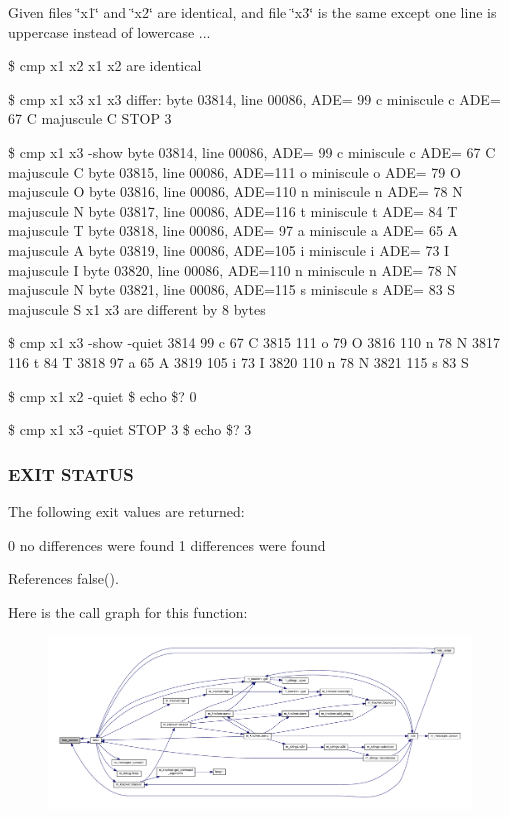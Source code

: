 Given files \char`\"{}x1\char`\"{} and \char`\"{}x2\char`\"{} are identical, and file \char`\"{}x3\char`\"{} is the same except one line is uppercase instead of lowercase ...

\$ cmp x1 x2 x1 x2 are identical

\$ cmp x1 x3 x1 x3 differ\+: byte 03814, line 00086, A\+DE= 99 c miniscule c A\+DE= 67 C majuscule C S\+T\+OP 3

\$ cmp x1 x3 -\/show byte 03814, line 00086, A\+DE= 99 c miniscule c A\+DE= 67 C majuscule C byte 03815, line 00086, A\+DE=111 o miniscule o A\+DE= 79 O majuscule O byte 03816, line 00086, A\+DE=110 n miniscule n A\+DE= 78 N majuscule N byte 03817, line 00086, A\+DE=116 t miniscule t A\+DE= 84 T majuscule T byte 03818, line 00086, A\+DE= 97 a miniscule a A\+DE= 65 A majuscule A byte 03819, line 00086, A\+DE=105 i miniscule i A\+DE= 73 I majuscule I byte 03820, line 00086, A\+DE=110 n miniscule n A\+DE= 78 N majuscule N byte 03821, line 00086, A\+DE=115 s miniscule s A\+DE= 83 S majuscule S x1 x3 are different by 8 bytes

\$ cmp x1 x3 -\/show -\/quiet 3814 99 c 67 C 3815 111 o 79 O 3816 110 n 78 N 3817 116 t 84 T 3818 97 a 65 A 3819 105 i 73 I 3820 110 n 78 N 3821 115 s 83 S

\$ cmp x1 x2 -\/quiet \$ echo \$? 0

\$ cmp x1 x3 -\/quiet S\+T\+OP 3 \$ echo \$? 3

\subsubsection*{E\+X\+IT S\+T\+A\+T\+US}

The following exit values are returned\+:

0 no differences were found 1 differences were found 

References false().

Here is the call graph for this function\+:
\nopagebreak
\begin{figure}[H]
\begin{center}
\leavevmode
\includegraphics[width=350pt]{__cmp_8f90_a39c21619b08a3c22f19e2306efd7f766_cgraph}
\end{center}
\end{figure}
\mbox{\label{__cmp_8f90_a099b4c5d750b7bb116895dc4fca1bf38}} 
